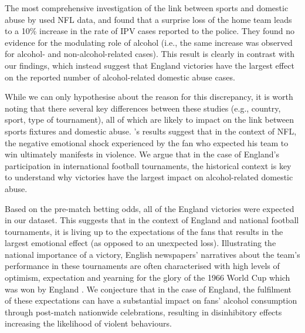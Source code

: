\documentclass[12pt, a4paper]{article}
\begin{document}
The most comprehensive investigation of the link between sports and domestic abuse by  used NFL data, and found that a surprise loss of the home team leads to a 10\% increase in the rate of IPV cases reported to the police. They found no evidence for the modulating role of alcohol (i.e., the same increase was observed for alcohol- and non-alcohol-related cases). This result is clearly in contrast with our findings, which instead suggest that England victories have the largest effect on the reported number of alcohol-related domestic abuse cases.

While we can only hypothesise about the reason for this discrepancy, it is worth noting that there several key differences between these studies (e.g., country, sport, type of tournament), all of which are likely to impact on the link between sports fixtures and domestic abuse. \citeauthor{Card2011}'s results suggest that in the context of NFL, the negative emotional shock experienced by the fan who expected his team to win ultimately manifests in violence. We argue that in the case of England's participation in international football tournaments, the historical context is key to understand why victories have the largest impact on alcohol-related domestic abuse.


Based on the pre-match betting odds, all of the England victories were expected in our dataset. This suggests that in the context of England and national football tournaments, it is living up to the expectations of the fans that results in the largest emotional effect (as opposed to an unexpected loss). Illustrating the national importance of a victory, English newspapers' narratives about the team's performance in these tournaments are often characterised with high levels of optimism, expectation and yearning for the glory of the 1966 World Cup which was won by England \cite{Vincent2010}. We conjecture that in the case of England, the fulfilment of these expectations can have a substantial impact on fans' alcohol consumption through post-match nationwide celebrations, resulting in disinhibitory effects increasing the likelihood of violent behaviours. 

   
\end{document}

